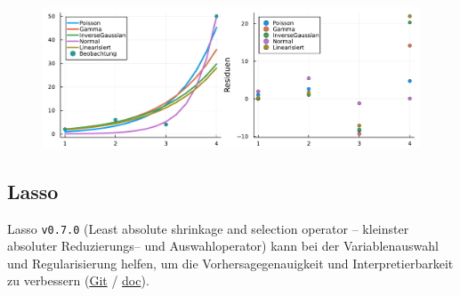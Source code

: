 \documentclass[10pt,twocolumn]{scrartcl}
\begin{document}
\begin{figure}[ht]
  \centering
  \includegraphics[width=.95\columnwidth]{glmLogLink.pdf}
\end{figure}

\subsection{Lasso}

Lasso \lstinline|v0.7.0| (Least absolute shrinkage and selection operator --
kleinster absoluter Reduzierungs-- und Auswahloperator) kann bei der
Variablenauswahl und Regularisierung helfen, um die Vorhersagegenauigkeit und
Interpretierbarkeit zu verbessern
(\href{https://github.com/JuliaStats/Lasso.jl}{Git} /
\href{https://juliastats.org/Lasso.jl/stable/}{doc}).
\end{document}
